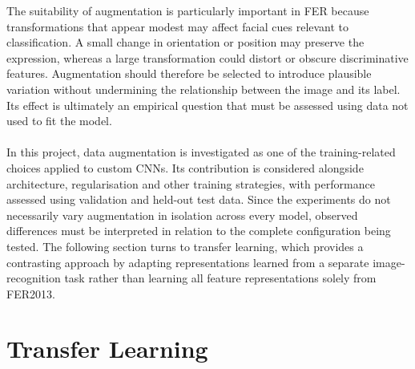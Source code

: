 \documentclass[12pt, a4paper]{report}
\let\oldsection\section
\renewcommand{\section}{%
    \Needspace{6\baselineskip}%
    \oldsection
}
\begin{document}
				 The suitability of augmentation is particularly important in FER because transformations that appear modest may affect facial cues relevant to classification. A small change in orientation or position may preserve the expression, whereas a large transformation could distort or obscure discriminative features. Augmentation should therefore be selected to introduce plausible variation without undermining the relationship between the image and its label. Its effect is ultimately an empirical question that must be assessed using data not used to fit the model.\\\\
				 In this project, data augmentation is investigated as one of the training-related choices applied to custom CNNs. Its contribution is considered alongside architecture, regularisation and other training strategies, with performance assessed using validation and held-out test data. Since the experiments do not necessarily vary augmentation in isolation across every model, observed differences must be interpreted in relation to the complete configuration being tested. The following section turns to transfer learning, which provides a contrasting approach by adapting representations learned from a separate image-recognition task rather than learning all feature representations solely from FER2013.
				
		\section{Transfer Learning}
			
\end{document}
